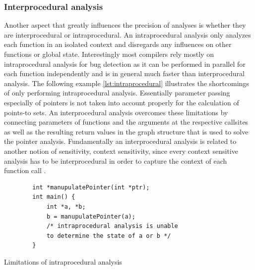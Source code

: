 \subsubsection{Interprocedural analysis}
Another aspect that greatly influences the precision of analyses is whether they are interprocedural or intraprocedural.
An intraprocedural analysis only analyzes each function in an isolated context and disregards any influences on other functions or global state.
Interestingly most compilers rely mostly on intraprocedural analysis for bug detection as it can be performed in parallel for each function independently and is in general much faster than interprocedural analysis.
The following example \autoref{lst:intraprocedural} illustrates the shortcomings of only performing intraprocedural analysis. Essentially parameter passing especially of pointers is not taken into account properly for the calculation of points-to sets.
An interprocedural analysis overcomes these limitations by connecting parameters of functions and the arguments at the respective callsites as well as the resulting return values in the graph structure that is used to solve the pointer analysis.
Fundamentally an interprocedural analysis is related to another notion of sensitivity, context sensitivity, since every context sensitive analysis has to be interprocedural in order to capture the context of each function call \cite{lin2015alias}.

\begin{listing}
    \begin{verbatim}
        int *manupulatePointer(int *ptr);
        int main() {
            int *a, *b;
            b = manupulatePointer(a);
            /* intraprocedural analysis is unable 
            to determine the state of a or b */
        }
    \end{verbatim}
    \caption{Limitations of intraprocedural analysis}
    \label{lst:intraprocedural}
\end{listing}

